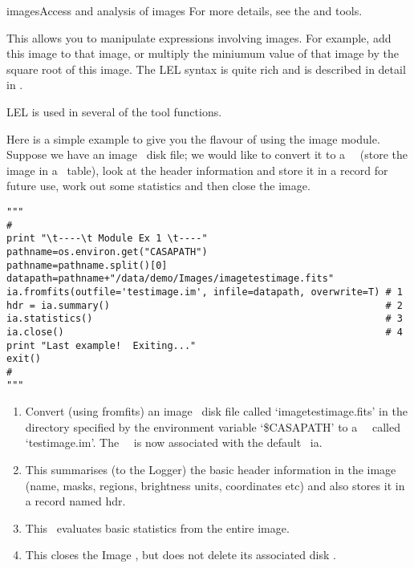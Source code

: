 \begin{ahmodule}{images}{Access and analysis of images}
For more details, see the  and
 tools.



\medskip
{}

This allows you to manipulate expressions involving images.  For
example, add this image to that image, or multiply the miniumum value of that
image by the square root of this image.  The LEL syntax is quite rich
and is described in detail in .  

LEL is used in several of the  tool
functions. 


\begin{ahexample}

Here is a simple example to give you the flavour of using the {\mf
image} module.  Suppose we have an image \fits\ disk file; we would like
to convert it to a \casa\  \imagefile\ (store the image in a \casa\
table), look at the header information and store it in a record
for future use, work out some statistics and then close the image.

\begin{verbatim}
"""
#
print "\t----\t Module Ex 1 \t----"
pathname=os.environ.get("CASAPATH")
pathname=pathname.split()[0]
datapath=pathname+"/data/demo/Images/imagetestimage.fits"
ia.fromfits(outfile='testimage.im', infile=datapath, overwrite=T) # 1
hdr = ia.summary()                                                # 2
ia.statistics()                                                   # 3
ia.close()                                                        # 4
print "Last example!  Exiting..."
exit()
#
"""
\end{verbatim}

\begin{enumerate}
    \item Convert (using {\stff fromfits}) an image \fits\ disk file
          called {\sff `imagetestimage.fits'} in the directory
          specified by the environment variable {\sff `\$CASAPATH'} 
          to a \casa\  \imagefile\ called {\sff `testimage.im'}.
          The \casa\ \imagefile\
          is now associated with the default \imagetool\ {\stf ia}.
    \item This summarises (to the Logger) the basic header information in the image
          (name, masks, regions, brightness units, coordinates etc) and also
      stores it in a record named hdr.
    \item This \toolfunction\ evaluates basic statistics from the entire image.
    \item This closes the Image \tool, but does not delete its associated disk \imagefile.


\end{enumerate}
\end{ahexample}
\end{ahmodule}
